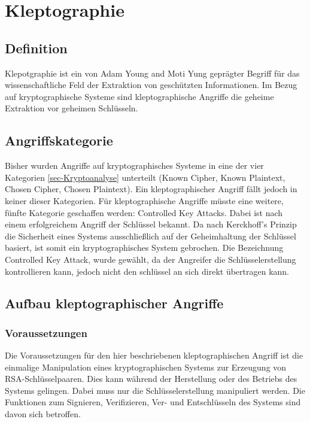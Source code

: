 \chapter{Kleptographie}
    \section{Definition}
        Klepotgraphie ist ein von Adam Young and Moti Yung geprägter Begriff für das wissenschaftliche Feld der Extraktion von geschützten Informationen. Im Bezug auf kryptographische Systeme sind kleptographische Angriffe die geheime Extraktion vor geheimen Schlüsseln.


    \section{Angriffskategorie}
        Bisher wurden Angriffe auf kryptographisches Systeme in eine der vier Kategorien \ref{sec-Kryptoanalyse} unterteilt (Known Cipher, Known Plaintext, Chosen Cipher, Chosen Plaintext). Ein kleptographischer Angriff fällt jedoch in keiner dieser Kategorien. Für kleptographische Angriffe müsste eine weitere, fünfte Kategorie geschaffen werden: Controlled Key Attacks. 
        Dabei ist nach einem erfolgreichem Angriff der Schlüssel bekannt. Da nach Kerckhoff's Prinzip die Sicherheit eines Systems ausschließlich auf der Geheimhaltung der Schlüssel basiert, ist somit ein kryptographisches System gebrochen. Die Bezeichnung Controlled Key Attack, wurde gewählt, da der Angreifer die Schlüsselerstellung kontrollieren kann, jedoch nicht den schlüssel an sich direkt übertragen kann.

    \section{Aufbau kleptographischer Angriffe}
    
        \subsection{Voraussetzungen} 
        Die Voraussetzungen für den hier beschriebenen kleptographischen Angriff ist die einmalige Manipulation eines kryptographischen Systems zur Erzeugung von \ac{RSA}-Schlüsselpaaren. Dies kann während der Herstellung oder des Betriebs des Systems gelingen. Dabei muss nur die Schlüsselerstellung manipuliert werden. Die Funktionen zum Signieren, Verifizieren, Ver- und Entschlüsseln des Systems sind davon sich betroffen.


